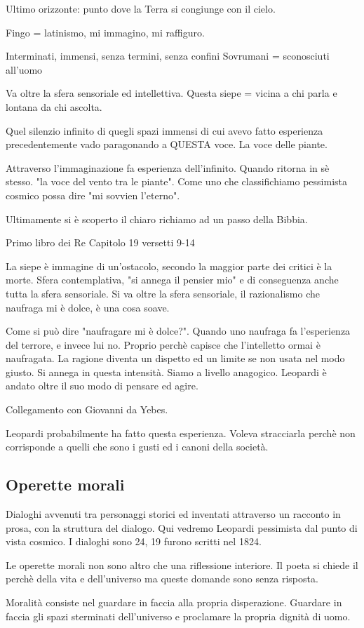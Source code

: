 \documentclass{article}
\begin{document}
    Ultimo orizzonte: punto dove la Terra si congiunge con il cielo.

    Fingo = latinismo, mi immagino, mi raffiguro.

    Interminati, immensi, senza termini, senza confini
    Sovrumani = sconosciuti all'uomo

    Va oltre la sfera sensoriale ed intellettiva.
    Questa siepe = vicina a chi parla e lontana da chi ascolta.

    Quel silenzio infinito di quegli spazi immensi di cui avevo fatto esperienza precedentemente vado paragonando a QUESTA voce. La voce delle piante.

    Attraverso l'immaginazione fa esperienza dell'infinito. Quando ritorna in sè stesso.
    "la voce del vento tra le piante".
    Come uno che classifichiamo pessimista cosmico possa dire "mi sovvien l'eterno".

    Ultimamente si è scoperto il chiaro richiamo ad un passo della Bibbia.

    Primo libro dei Re Capitolo 19 versetti 9-14

    La siepe è immagine di un'ostacolo, secondo la maggior parte dei critici è la morte.
    Sfera contemplativa, "si annega il pensier mio" e di conseguenza anche tutta la sfera sensoriale. Si va oltre la sfera sensoriale, il razionalismo che naufraga mi è dolce, è una cosa soave.

    Come si può dire "naufragare mi è dolce?". Quando uno naufraga fa l'esperienza del terrore, e invece lui no. Proprio perchè capisce che l'intelletto ormai è naufragata. La ragione diventa un dispetto ed un limite se non usata nel modo giusto. Si annega in questa intensità. Siamo a livello anagogico. Leopardi è andato oltre il suo modo di pensare ed agire.

    Collegamento con Giovanni da Yebes.

    Leopardi probabilmente ha fatto questa esperienza. Voleva stracciarla perchè non corrisponde a quelli che sono i gusti ed i canoni della società.

    \subsection{Operette morali}
    Dialoghi avvenuti tra personaggi storici ed inventati attraverso un racconto in prosa, con la struttura del dialogo. Qui vedremo Leopardi pessimista dal punto di vista cosmico. I dialoghi sono 24, 19 furono scritti nel 1824.

    Le operette morali non sono altro che una riflessione interiore. Il poeta si chiede il perchè della vita e dell'universo ma queste domande sono senza risposta.

    Moralità consiste nel guardare in faccia alla propria disperazione. Guardare in faccia gli spazi sterminati dell'universo e proclamare la propria dignità di uomo.
\end{document}
